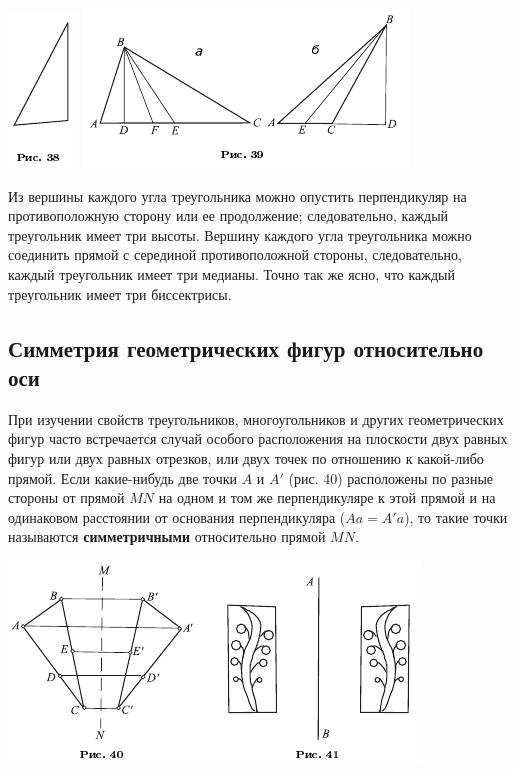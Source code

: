 \documentclass[oneside]{book}
\begin{document}
\includegraphics{pics/ris-38}
\includegraphics{pics/ris-39}

Из вершины каждого угла треугольника можно опустить перпендикуляр на противоположную сторону или ее продолжение;
следовательно, каждый треугольник имеет три высоты.
Вершину каждого угла треугольника можно соединить прямой с серединой противоположной стороны, следовательно, каждый треугольник имеет три медианы.
Точно так же ясно, что каждый треугольник имеет три биссектрисы.

\subsection*{Симметрия геометрических фигур относительно оси}

При изучении свойств треугольников, многоугольников и других геометрических фигур часто встречается случай особого расположения на плоскости двух равных фигур или двух равных отрезков, или двух точек по отношению к какой-либо прямой.
Если какие-нибудь две точки $A$ и $A'$ (рис. 40) расположены по разные стороны от прямой $MN$ на одном и том же перпендикуляре к этой прямой и на одинаковом расстоянии от основания перпендикуляра ($Aa=A'a$), то такие точки называются \textbf{симметричными} относительно прямой $MN$.

\includegraphics{pics/ris-40-41}
\end{document}

